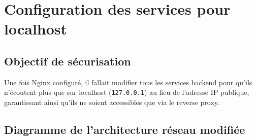 \documentclass[12pt,a4paper]{article}
\begin{document}

\section{Configuration des services pour localhost}

\subsection{Objectif de sécurisation}

Une fois Nginx configuré, il fallait modifier tous les services backend pour qu'ils n'écoutent plus que sur localhost (\texttt{127.0.0.1}) au lieu de l'adresse IP publique, garantissant ainsi qu'ils ne soient accessibles que via le reverse proxy.

\subsection{Diagramme de l'architecture réseau modifiée}
\end{document}
